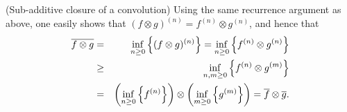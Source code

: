 %
\vspace{1ex}
\noindent
(Sub-additive closure of a convolution)
Using the same recurrence argument as above, one easily shows that $(f \otimes g)^{(n)} = f^{(n)} \otimes g^{(n)}$,
and hence that
%
%
\begin{eqnarray}
\overline{f \otimes g} & = & \inf_{n \geq 0} \left\{ (f \otimes g)^{(n)} \right\} =
                \inf_{n \geq 0} \left\{ f^{(n)} \otimes g^{(n)} \right\} \nonumber \\
            & \geq &  \inf_{n,m \geq 0} \left\{ f^{(n)} \otimes g^{(m)} \right\} \nonumber \\
            & = &   \left( \inf_{n \geq 0} \left\{ f^{(n)} \right\} \right) \otimes
              \left( \inf_{m \geq 0} \left\{ g^{(m)} \right\} \right) = \overline{f} \otimes \overline{g}.
        \mylabel{eq:resulttempclosure}
\end{eqnarray}
